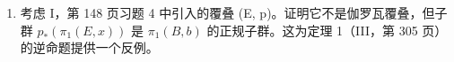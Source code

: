 \exercisegroup

\begin{enumerate}
\def\labelenumi{\arabic{enumi})}
\tightlist
\item
  考虑 I，第 148 页习题 4 中引入的覆叠 (E, p)。证明它不是伽罗瓦覆叠，但子群 \(p_{*}(\pi_{1}(E, x))\) 是 \(\pi_{1}(B, b)\) 的正规子群。这为定理 1（III，第 305 页）的逆命题提供一个反例。
\end{enumerate}

